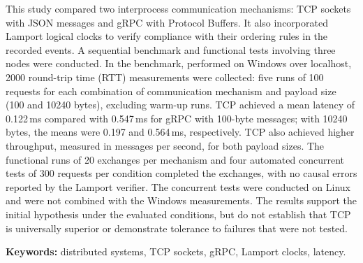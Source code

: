This study compared two interprocess communication mechanisms: TCP sockets with JSON messages and gRPC with Protocol Buffers. It also incorporated Lamport logical clocks to verify compliance with their ordering rules in the recorded events. A sequential benchmark and functional tests involving three nodes were conducted. In the benchmark, performed on Windows over localhost, 2000 round-trip time (RTT) measurements were collected: five runs of 100 requests for each combination of communication mechanism and payload size (100 and 10240 bytes), excluding warm-up runs. TCP achieved a mean latency of 0.122\,ms compared with 0.547\,ms for gRPC with 100-byte messages; with 10240 bytes, the means were 0.197 and 0.564\,ms, respectively. TCP also achieved higher throughput, measured in messages per second, for both payload sizes. The functional runs of 20 exchanges per mechanism and four automated concurrent tests of 300 requests per condition completed the exchanges, with no causal errors reported by the Lamport verifier. The concurrent tests were conducted on Linux and were not combined with the Windows measurements. The results support the initial hypothesis under the evaluated conditions, but do not establish that TCP is universally superior or demonstrate tolerance to failures that were not tested.

\par\smallskip
\noindent\textbf{Keywords:}
distributed systems, TCP sockets, gRPC,
Lamport clocks, latency.
\clearpage
